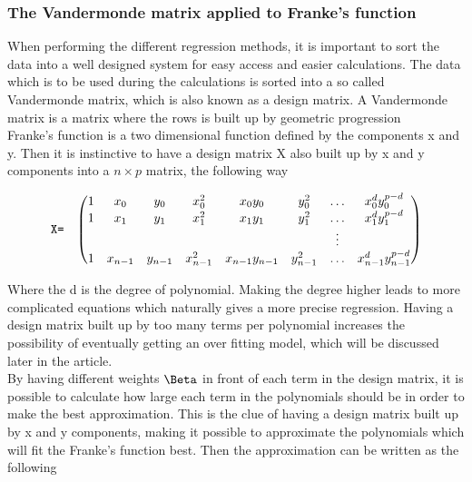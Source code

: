 \subsubsection{The Vandermonde matrix applied to Franke's function}

When performing the different regression methods, it is important to sort the data into a well designed system for easy access and easier calculations. The data which is to be used during the calculations is sorted into a so called Vandermonde matrix, which is also known as a design matrix. A Vandermonde matrix is a matrix where the rows is built up by geometric progression \\%

Franke's function is a two dimensional function defined by the components x and y. Then it is instinctive to have a design matrix X also built up by x and y components into a $n\times p$ matrix, the following way

\[
\begin{array}{lccccccc}
  \verb|X=| & \left(\begin{array}{@{}cccccccc@{}}
   1& x_0 & y_0 & x_0^2 & x_0y_0 & y_0^2 & \ldots & x_0^d y_0^{p-d}\\
    1& x_1 & y_1 & x_1^2 & x_1y_1 & y_1^2 & \ldots & x_1^d y_1^{p-d}\\
    & &  &  &  &  & \vdots & \\
    1 & x_{n-1} & y_{n-1} & x_{n-1}^2 & x_{n-1}y_{n-1} & y_{n-1}^2 & \ldots & x_{n-1}^d y_{n-1}^{p-d}\\
 \end{array}\right) \\[15pt]
\end{array}
\]

Where the d is the degree of polynomial. Making the degree higher leads to more complicated equations which naturally gives a more precise regression. Having a design matrix built up by too many terms per polynomial increases the possibility of eventually getting an over fitting model, which will be discussed later in the article.\\

By having different weights $\Beta$ in front of each term in the design matrix, it is possible to calculate how large each term in the polynomials should be in order to make the best approximation. This is the clue of having a design matrix built up by x and y components, making it possible to approximate the polynomials which will fit the Franke's function best. Then the approximation can be written as the following

